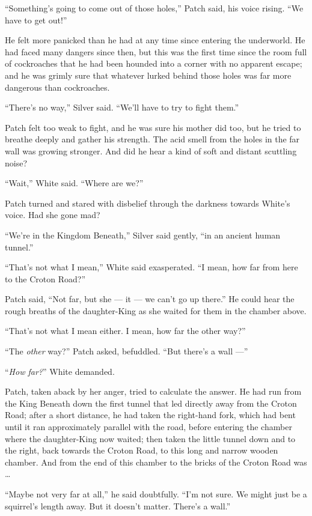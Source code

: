 \documentclass[ebook,oneside,openany,12pt]{memoir}
\begin{document}
“Something’s going to come out of those holes,” Patch said, his voice
rising. “We have to get out!”

He felt more panicked than he had at any time since entering the
underworld. He had faced many dangers since then, but this was the
first time since the room full of cockroaches that he had been hounded
into a corner with no apparent escape; and he was grimly sure that
whatever lurked behind those holes was far more dangerous than
cockroaches.

“There’s no way,” Silver said. “We’ll have to try to fight them.”

Patch felt too weak to fight, and he was sure his mother did too, but
he tried to breathe deeply and gather his strength. The acid smell
from the holes in the far wall was growing stronger. And did he hear a
kind of soft and distant scuttling noise?

“Wait,” White said. “Where are we?”

Patch turned and stared with disbelief through the darkness towards
White’s voice. Had she gone mad?

“We’re in the Kingdom Beneath,” Silver said gently, “in an ancient
human tunnel.”

“That’s not what I mean,” White said exasperated. “I mean, how far
from here to the Croton Road?”

Patch said, “Not far, but she — it — we can’t go up there.” He could
hear the rough breaths of the daughter-King as she waited for them in
the chamber above.

“That’s not what I mean either. I mean, how far the other way?”

“The \emph{other} way?” Patch asked, befuddled. “But there’s a wall
—”

“\emph{How far?}” White demanded.

Patch, taken aback by her anger, tried to calculate the answer. He had
run from the King Beneath down the first tunnel that led directly away
from the Croton Road; after a short distance, he had taken the
right-hand fork, which had bent until it ran approximately parallel
with the road, before entering the chamber where the daughter-King now
waited; then taken the little tunnel down and to the right, back
towards the Croton Road, to this long and narrow wooden chamber. And
from the end of this chamber to the bricks of the Croton Road was …

“Maybe not very far at all,” he said doubtfully. “I’m not sure. We
might just be a squirrel’s length away. But it doesn’t matter. There’s
a wall.”
\end{document}
